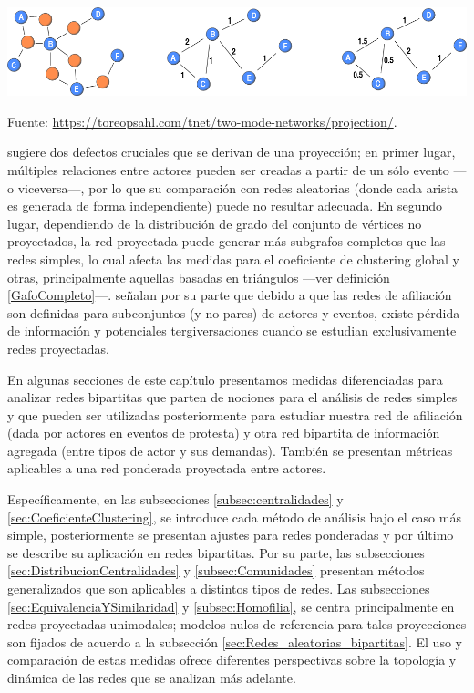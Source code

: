 \documentclass[letterpaper, 11pt]{book}
\theoremstyle{definition}
\theoremstyle{remark}
\begin{document}
\hspace{-1em}\begin{minipage}{\linewidth}
\centering
{} \label{1.4_ProyeccionesBipartitas}
\includegraphics[scale=0.38]{img/1.4_ProyeccionesBipartitas.png}
\par\bigskip
\small Fuente: \url{https://toreopsahl.com/tnet/two-mode-networks/projection/}.
\end{minipage}\bigskip


\citet{2013_Opsahl_BipartiteCluster} sugiere dos defectos cruciales que se derivan de una proyección; en primer lugar, múltiples relaciones entre actores pueden ser creadas a partir de un sólo evento ---o viceversa---, por lo que su comparación con redes aleatorias (donde cada arista es generada de forma independiente) puede no resultar adecuada. 
En segundo lugar, dependiendo de la distribución de grado del conjunto de vértices no proyectados, la red proyectada puede generar más subgrafos completos que las redes simples, lo cual afecta las medidas para el coeficiente de clustering global y otras, principalmente aquellas basadas en triángulos ---ver definición \ref{GafoCompleto}---. 
\citet{1994_Wasserman_SNA} señalan por su parte que debido a que las redes de afiliación son definidas para subconjuntos (y no pares) de actores y eventos, existe pérdida de información y potenciales tergiversaciones cuando se estudian exclusivamente redes proyectadas. 



En algunas secciones de este capítulo presentamos medidas diferenciadas para analizar redes bipartitas que parten de nociones para el análisis de redes simples y que pueden ser utilizadas posteriormente para estudiar nuestra red de afiliación (dada por actores en eventos de protesta) y otra red bipartita de información agregada (entre tipos de actor y sus demandas). 
También se presentan métricas aplicables a una red ponderada proyectada entre actores. 

Específicamente, en las subsecciones \ref{subsec:centralidades} y \ref{sec:CoeficienteClustering}, se introduce cada método de análisis bajo el caso más simple, posteriormente se presentan ajustes para redes ponderadas y por último se describe su aplicación en redes bipartitas. 
Por su parte, las subsecciones \ref{sec:DistribucionCentralidades} y \ref{subsec:Comunidades} presentan métodos generalizados que son aplicables a distintos tipos de redes. 
Las subsecciones \ref{sec:EquivalenciaYSimilaridad} y \ref{subsec:Homofilia}, se centra principalmente en redes proyectadas unimodales; modelos nulos de referencia para tales proyecciones son fijados de acuerdo a la subsección \ref{sec:Redes_aleatorias_bipartitas}. 
El uso y comparación de estas medidas ofrece diferentes perspectivas sobre la topología y dinámica de las redes que se analizan más adelante. 
\end{document}
